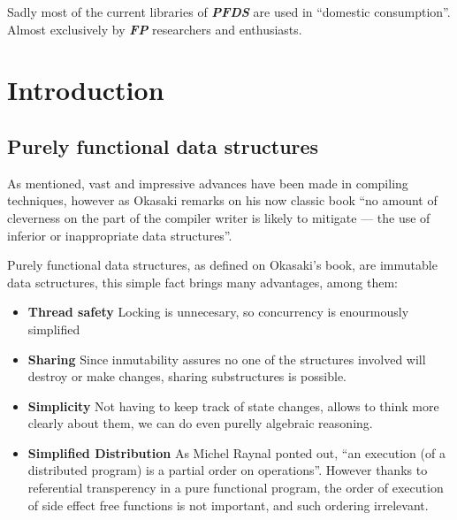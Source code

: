 \documentclass{tufte-book} %
\newcommand{\doccls}[1]{\texttt{#1}}
\newcommand{\pfds}{\textbf{\textit{PFDS}}\xspace}
\newcommand{\fp}{\textbf{\textit{FP}}\xspace}
\begin{document}
Sadly most of the current libraries of \pfds are used in ``domestic consumption''. Almost exclusively by \fp researchers and enthusiasts.\\




\chapter{Introduction}
\label{ch:tufte-design}
\section{Purely functional data structures}

As mentioned, vast and impressive advances have been made in compiling techniques, however as \cite{Okasaki1999} Okasaki remarks on his now classic book  ``no amount of cleverness on the part of the compiler writer is likely to mitigate — the use of inferior or inappropriate data structures''.

Purely functional data structures, as defined on Okasaki's book, are immutable data sctructures, this simple fact brings many advantages, among them:
\begin{itemize}
\item {\bf Thread safety} Locking is unnecesary, so concurrency is enourmously simplified
\item {\bf Sharing} Since inmutability assures no one of the structures involved will destroy or make changes, sharing substructures is possible.
\item{\bf Simplicity} Not having to keep track of state changes, allows to think more clearly about them, we can do even purelly algebraic reasoning.
\item {\bf Simplified Distribution} As Michel Raynal \cite{Raynal2013} ponted out, ``an execution (of a distributed program) is a partial order on operations''. However thanks to referential transperency in a pure functional program, the order of execution of side effect free functions is not important, and such ordering irrelevant.
\end{itemize}
\end{document}
